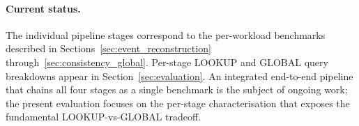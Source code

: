 \paragraph{Current status.}
The individual pipeline stages correspond to the per-workload benchmarks described in Sections~\ref{sec:event_reconstruction} through~\ref{sec:consistency_global}. Per-stage LOOKUP and GLOBAL query breakdowns appear in Section~\ref{sec:evaluation}. An integrated end-to-end pipeline that chains all four stages as a single benchmark is the subject of ongoing work; the present evaluation focuses on the per-stage characterisation that exposes the fundamental LOOKUP-vs-GLOBAL tradeoff.
\endinput
